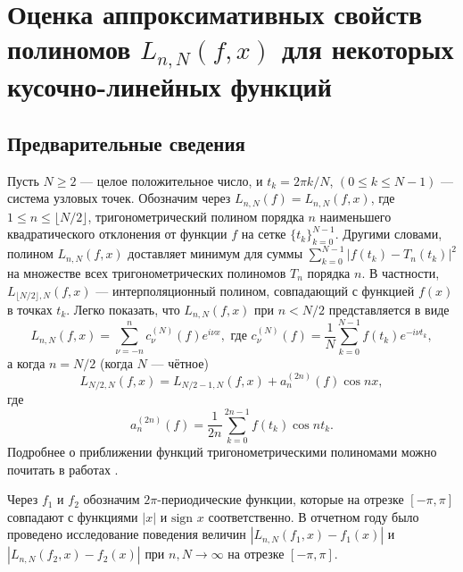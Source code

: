 \chapter{Оценка аппроксимативных свойств полиномов $L_{n,N}(f,x)$ для некоторых кусочно-линейных функций}


\section{Предварительные сведения}



Пусть $N \geq 2$ --- целое положительное число, и
$t_k = 2\pi k/N$, $(0 \leq k \leq N-1)$
--- система узловых точек. Обозначим через
$ L_{n,N}(f) = L_{n,N}(f,x)$, где $1 \leq n \leq \lfloor N/2\rfloor$,
тригонометрический полином порядка $n$ наименьшего квадратического отклонения от функции $f$ на сетке
$\{t_k\}_{k=0}^{N-1}$. Другими словами, полином $L_{n,N}(f,x)$ доставляет минимум для
суммы
$\sum_{k=0}^{N-1}|f(t_k)-T_n(t_k)|^2$
на множестве всех тригонометрических полиномов $T_n$ порядка $n$.
В частности, $L_{\lfloor N/2 \rfloor,N}(f,x)$ --- интерполяционный полином, совпадающий с функцией $f(x)$ в
точках $t_k$.
Легко показать\cite{aggshii_article}, что $L_{n,N}(f,x)$ при $n < N/2$ представляется в виде
\begin{equation*}
	L_{n,N}(f,x) = \sum\limits_{\nu = -n}^{n} c_\nu^{(N)}(f) e^{i\nu x}, \mbox{ где } c_\nu^{(N)}(f) = \frac{1}{N}\sum\limits_{k=0}^{N-1} f(t_k)e^{-i\nu t_k},
\end{equation*}
а когда $n = N/2$ (когда $N$ --- чётное)
\begin{equation} \label{L=L+a}
	L_{N/2,N}(f,x) = L_{N/2-1,N}(f,x) + a_n^{(2n)}(f)\cos nx,
\end{equation}
где
\begin{equation} \label{a_n_formula}
	a_n^{(2n)}(f) = \frac{1}{2n}\sum_{k=0}^{2n-1}f(t_k)\cos nt_k.
\end{equation}
Подробнее о приближении функций тригонометрическими полиномами можно почитать в работах \cite{agg2_bernstein,agg4_erdos,agg7_kalashnikov,agg8_krilov,agg9_marcinkiewicz,agg10_marcinkiewicz,agg11_natanson,LapVPNIK,agg17_turetsky,LapVPZigmund}.

Через
$f_1$ и $f_2$ обозначим $2\pi$-периодические функции, которые на отрезке $[-\pi, \pi]$ совпадают с функциями $|x|$ и $\mbox{sign } x$ соответственно.
В отчетном году было проведено исследование поведения величин $|L_{n,N}(f_1,x) - f_1(x)|$ и $|L_{n,N}(f_2,x) - f_2(x)|$ при $n,N \to \infty$  на отрезке $[-\pi, \pi]$.







